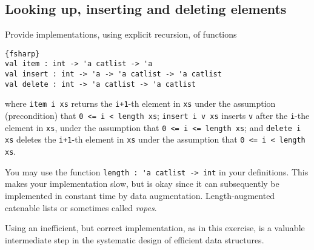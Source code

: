 \subsection*{Looking up, inserting and deleting elements}

Provide implementations, using explicit recursion, of functions
\begin{lstlisting}{fsharp}
val item : int -> 'a catlist -> 'a
val insert : int -> 'a -> 'a catlist -> 'a catlist
val delete : int -> 'a catlist -> 'a catlist
\end{lstlisting}
where \verb|item i xs| returns the \verb|i+1|-th element in \verb|xs| under the assumption (precondition) that \verb|0 <= i < length xs|;
\verb|insert i v xs| inserts \verb|v| after the \verb|i|-the element in \verb|xs|, under the assumption that \verb|0 <= i <= length xs|;
and \verb|delete i xs| deletes the \verb|i+1|-th element in \verb|xs| under the assumption that \verb|0 <= i < length xs|.

You may use the function \verb|length : 'a catlist -> int| in your definitions. This makes your implementation slow, but is okay since it can subsequently be implemented in constant time by data augmentation. Length-augmented catenable lists or sometimes called \emph{ropes}.

Using an inefficient, but correct implementation, as in this exercise, is a valuable intermediate step in the systematic design of efficient data structures.  
